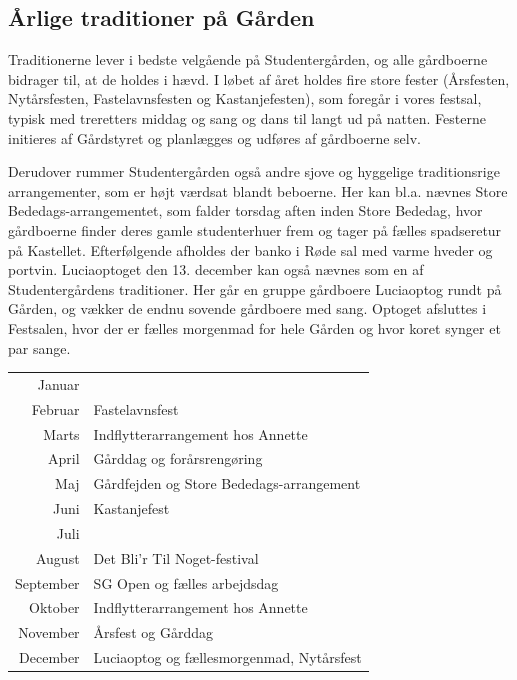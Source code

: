 \documentclass[11pt,article,twoside,openany,danish,extrafontsizes]{memoir} %
\begin{document}
\subsection{Årlige traditioner på Gården}
Traditionerne lever i bedste velgående på Studentergården, og alle gårdboerne bidrager til, at de holdes i hævd. I løbet af året holdes fire store fester (Årsfesten, Nytårsfesten, Fastelavnsfesten og Kastanjefesten), som foregår i vores festsal, typisk med treretters middag og sang og dans til langt ud på natten. Festerne initieres af Gårdstyret og planlægges og udføres af gårdboerne selv.

Derudover rummer Studentergården også andre sjove og hyggelige traditionsrige arrangementer, som er højt værdsat blandt beboerne. Her kan bl.a. nævnes Store Bededags-arrangementet, som falder torsdag aften inden Store Bededag, hvor gårdboerne finder deres gamle studenterhuer frem og tager på fælles spadseretur på Kastellet. Efterfølgende afholdes der banko i Røde sal med varme hveder og portvin. Luciaoptoget den 13. december kan også nævnes som en af Studentergårdens traditioner. Her går en gruppe gårdboere Luciaoptog rundt på Gården, og vækker de endnu sovende gårdboere med sang. Optoget afsluttes i Festsalen, hvor der er fælles morgenmad for hele Gården og hvor koret synger et par sange.

\bigskip

\begin{shaded}
\begin{tabular}{>{\sffamily}r l}
Januar				& \\
Februar				& Fastelavnsfest \\
Marts				& Indflytterarrangement hos Annette \\
April				& Gårddag og forårsrengøring \\
Maj					& Gårdfejden og Store Bededags-arrangement \\
Juni				& Kastanjefest \\
Juli				& \\
August				& Det Bli’r Til Noget-festival \\
September			& SG Open og fælles arbejdsdag \\
Oktober				& Indflytterarrangement hos Annette \\
November			& Årsfest og Gårddag \\
December			& Luciaoptog og fællesmorgenmad, Nytårsfest \\
\end{tabular}
\end{shaded}
\end{document}
